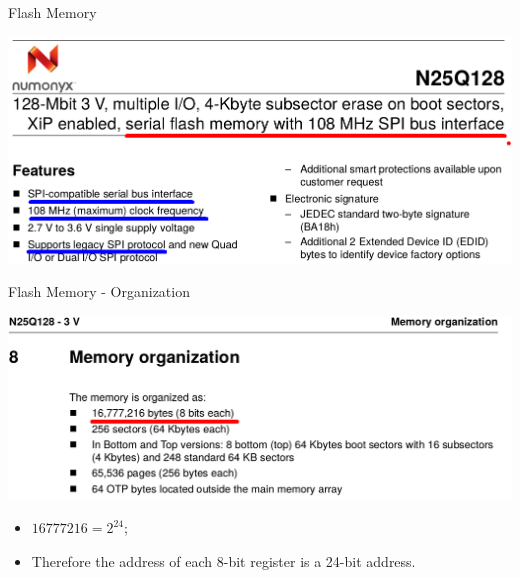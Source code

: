 \documentclass[ignorenonframetext,aspectratio=43,]{beamer}
\begin{document}
\begin{frame}{Flash Memory}
\protect\hypertarget{flash-memory}{}

\includegraphics[width=1\textwidth,height=\textheight]{images/flash}

\end{frame}

\begin{frame}{Flash Memory - Organization}
\protect\hypertarget{flash-memory---organization}{}

\includegraphics[width=1\textwidth,height=\textheight]{images/org}

\begin{itemize}
\item
  \(16777216 = 2^{24}\);
\item
  Therefore the address of each 8-bit register is a 24-bit address.
\end{itemize}

\end{frame}
\end{document}
